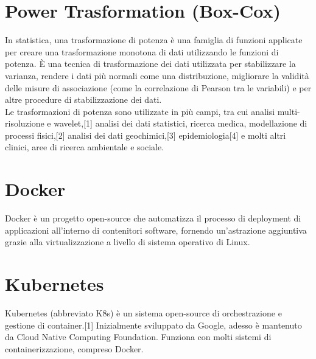 \documentclass[12pt,a4paper]{report}
\begin{document}
\begin{appendices}
\section{Power Trasformation (Box-Cox)}
\label{appendix:Box-Cox}
In statistica, una trasformazione di potenza è una famiglia di funzioni applicate per creare una trasformazione monotona di dati utilizzando le funzioni di potenza. È una tecnica di trasformazione dei dati utilizzata per stabilizzare la varianza, rendere i dati più normali come una distribuzione, migliorare la validità delle misure di associazione (come la correlazione di Pearson tra le variabili) e per altre procedure di stabilizzazione dei dati.\\
Le trasformazioni di potenza sono utilizzate in più campi, tra cui analisi multi-risoluzione e wavelet,[1] analisi dei dati statistici, ricerca medica, modellazione di processi fisici,[2] analisi dei dati geochimici,[3] epidemiologia[4] e molti altri clinici, aree di ricerca ambientale e sociale.

\section{Docker}
\label{appendix:Docker}
Docker è un progetto open-source che automatizza il processo di deployment di applicazioni all'interno di contenitori software, fornendo un'astrazione aggiuntiva grazie alla virtualizzazione a livello di sistema operativo di Linux.\cite{itwiki:123095653}

\section{Kubernetes}
\label{appendix:Kubernetes}
Kubernetes (abbreviato K8s) è un sistema open-source di orchestrazione e gestione di container.[1] Inizialmente sviluppato da Google, adesso è mantenuto da Cloud Native Computing Foundation. Funziona con molti sistemi di containerizzazione, compreso Docker.\cite{itwiki:119581182}


\end{appendices}
\end{document}
